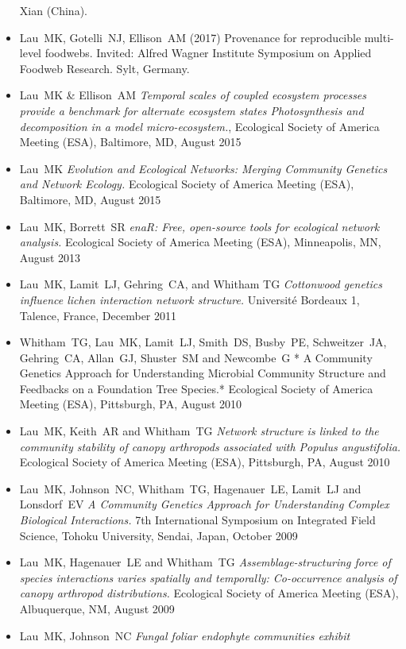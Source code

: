 \documentclass[a4paper]{article}
\begin{document}
\begin{itemize}
  Xian (China).
\item Lau~MK, Gotelli~NJ, Ellison~AM (2017) Provenance for
  reproducible multi-level foodwebs. Invited: Alfred Wagner Institute
  Symposium on Applied Foodweb Research. Sylt, Germany. 
\item Lau~MK \& Ellison~AM \emph{Temporal scales of coupled ecosystem
  processes provide a benchmark for alternate ecosystem states
  Photosynthesis and decomposition in a model micro-ecosystem.},
  Ecological Society of America Meeting (ESA), Baltimore, MD, August
  2015
\item Lau~MK \emph{Evolution and Ecological Networks: Merging
  Community Genetics and Network Ecology.} Ecological Society of
  America Meeting (ESA), Baltimore, MD, August 2015
\item
  Lau~MK, Borrett~SR \emph{enaR: Free, open-source tools for ecological
  network analysis.} Ecological Society of America Meeting (ESA),
  Minneapolis, MN, August 2013
\item
  Lau~MK, Lamit~LJ, Gehring~CA, and Whitham TG \emph{Cottonwood genetics
  influence lichen interaction network structure.} Université Bordeaux
  1, Talence, France, December 2011
\item
  Whitham~TG, Lau~MK, Lamit~LJ, Smith~DS, Busby~PE, Schweitzer~JA,
  Gehring~CA, Allan~GJ, Shuster~SM and Newcombe~G * A Community Genetics
  Approach for Understanding Microbial Community Structure and Feedbacks
  on a Foundation Tree Species.* Ecological Society of America Meeting
  (ESA), Pittsburgh, PA, August 2010
\item
  Lau~MK, Keith~AR and Whitham~TG \emph{Network structure is linked to
  the community stability of canopy arthropods associated with Populus
  angustifolia.} Ecological Society of America Meeting (ESA),
  Pittsburgh, PA, August 2010
\item
  Lau~MK, Johnson~NC, Whitham~TG, Hagenauer~LE, Lamit~LJ and Lonsdorf~EV
  \emph{A Community Genetics Approach for Understanding Complex
  Biological Interactions.} 7th International Symposium on Integrated
  Field Science, Tohoku University, Sendai, Japan, October 2009
\item
  Lau~MK, Hagenauer~LE and Whitham~TG \emph{Assemblage-structuring force
  of species interactions varies spatially and temporally: Co-occurrence
  analysis of canopy arthropod distributions.} Ecological Society of
  America Meeting (ESA), Albuquerque, NM, August 2009
\item
  Lau~MK, Johnson~NC \emph{Fungal foliar endophyte communities exhibit
}
\end{itemize}
\end{document}
